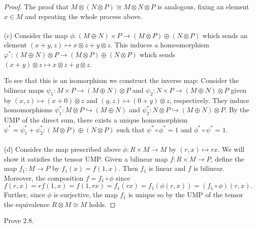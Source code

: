 \begin{proof}
The proof that $M\otimes (N\otimes P)\cong M\otimes N\otimes P$
is analogous, fixing an element $x\in M$ and repeating the whole
process above.
\\\\
(c) Consider the map $\phi\colon(M\oplus N)\times P\to (M\otimes
P)\oplus (N\otimes P)$ which sends an element $(x+y,z)\mapsto
x\otimes z+y\otimes z$. This induces a homeomorphism
$\varphi^*\colon (M\oplus N)\otimes P\to (M\otimes P)\oplus
(N\otimes P)$ which sends $(x+y)\otimes z\mapsto x\otimes
z+y\otimes z$.

To see that this is an isomorphism we construct the inverse map:
Consider the bilinear maps $\psi_1\colon M\times P\to (M\oplus
N)\otimes P$ and $\psi_2\colon N\times P\to(M\oplus N)\otimes
P$ given by $(x,z)\mapsto (x+0)\otimes z$ and $(y,z)\mapsto
(0+y)\otimes z$, respectively. They induce homomorphisms
$\psi_1^*\colon M\otimes P\hookrightarrow (M\oplus N)$ and
$\psi_2^*\colon N\otimes P\hookrightarrow (M\oplus N)\otimes
P$. By the UMP of the direct sum, there exists a unique
homomorphism $\psi^*=\psi_1^*+\psi_2^*\colon(M\otimes P)\oplus
(N\otimes P)$ such that $\psi^*\circ\phi^*=1$ and
$\phi^*\circ\psi^*=1$.
\\\\
(d) Consider the map prescribed above $\phi\colon R\times M\to
M$ by $(r,x)\mapsto rx$. We will show it satisfies the
tensor UMP. Given a bilinear map $f\colon R\times M\to P$, define
the map $f_1\colon M\to P$ by $f_1(x)=f(1,x)$. Then $f_1$ is
linear and $f$ is bilinear. Moreover, the composition
$f=f_1\circ\phi$ since
\[
f(r,x)=rf(1,x)=f(1,rx)=f_1(rx)=f_1(\phi(r,x))=\left(f_1\circ\phi\right)(r,x).
\]
Further, since $\phi$ is surjective, the map $f_1$ is unique so
by the UMP of the tensor the equivalence $R\otimes M\cong M$
holds.
\end{proof}
\newpage
\begin{problem}
Prove 2.8.
\end{problem}
